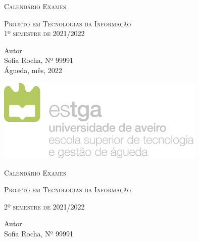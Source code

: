 \documentclass[12pt, twoside]{report}
\begin{document}
	
\onehalfspacing %

	
	\begin{titlepage}
		\centering
		\scshape\Huge Calendário Exames\par
		\vspace{0.9cm}
		
		\scshape\large Projeto em Tecnologias da Informação \\
		\vspace{0.3cm}
		\scshape\large 1º semestre de 2021/2022\par
		\vspace{0.4cm}
		\centering
		
		\vspace{3cm}
		
		\large
		Autor\\
		Sofia Rocha, Nº 99991 \\
		
		\vspace{2cm}
		\large
		Águeda, mês, 2022 \\
		
		\vspace{4cm}
		
		\centering
		\includegraphics[width=10cm]{image/AssB_vertical_cor.png}
		
		
		\newpage
		\thispagestyle{plain}%
		\thispagestyle{empty}%
		\centering
		\scshape\Huge Calendário Exames \par
		\vspace{1cm}
		
		\scshape\large Projeto em Tecnologias da Informação\par
		\vspace{1cm}
		\scshape\large 2º semestre de 2021/2022\par
		\vspace{4cm}
		
		\large
		Autor\\
		Sofia Rocha, Nº 99991 \\
		

\end{titlepage}
\end{document}

